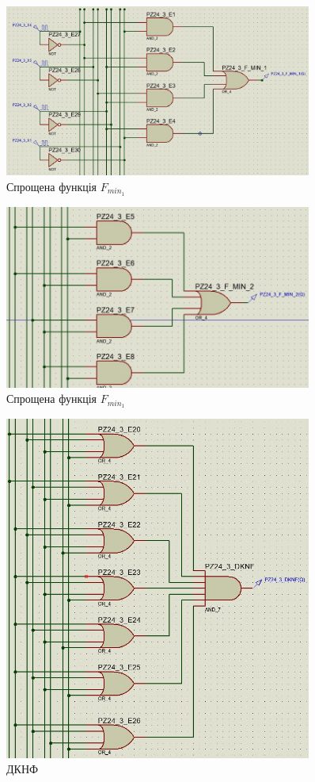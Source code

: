 \documentclass[12pt]{extarticle}
\begin{document}
\begin{figure}[H]
    \centering
    \includegraphics[width=0.90\textwidth]{f_min_1.jpg}
    \caption{Спрощена функція $F_{min_1}$}
\end{figure}
\begin{figure}[H]
    \centering
    \includegraphics[width=0.90\textwidth]{f_min_2.jpg}
    \caption{Спрощена функція $F_{min_1}$}
\end{figure}
\begin{figure}[H]
    \centering
    \includegraphics[width=0.90\textwidth]{dknf.jpg}
    \caption{ДКНФ}
\end{figure}
\end{document}
